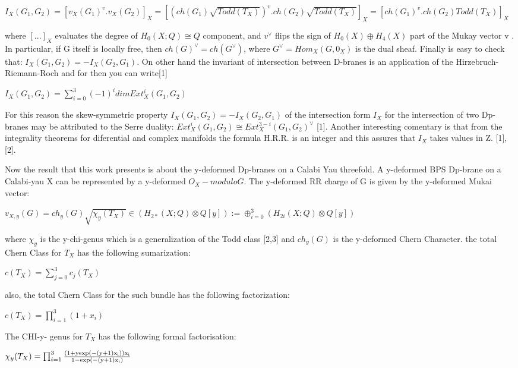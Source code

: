\documentclass[a4paper,a4paper]{article}
\begin{document}
\begin{center}
\setlength{\baselineskip}{30pt}
{  $ I_{X}(G_1,G_2)=[v_{X}(G_1)^v.v_{X}(G_2)]_X=[(ch(G_1)\sqrt{Todd(T_{X})})^v.ch(G_2)\sqrt{Todd(T_{X})}]_X=[ch(G_1)^v.ch(G_2)Todd(T_{X})]_X $ }
\end{center}
where $ [...]_X $  evaluates the degree of $ H_{0}(X;Q){\cong}Q$ component, and $v^{\vee}$ flips the sign of $H_{0}(X){\oplus}H_{4}(X)$ part of the Mukay vector v . In particular, if G itself is locally free, then $ch(G)^{\vee}=ch(G^{\vee})$, where  $ G^{\vee}=Hom_{X}(G,0_X)$ is the dual sheaf. Finally is easy to check that: $I_{X}(G_1,G_2) =-I_{X}(G_2,G_1)$.
On other hand the invariant of intersection between D-branes is an application of the Hirzebruch-Riemann-Roch and for then you can write[1]
\begin{center}

{  $ I_{X}(G_1,G_2)=\sum_{i=0}^{3}(-1)^idimExt^i_X(G_1,G_2) $ }
\end{center}
For this reason the skew-symmetric property $I_{X}(G_1,G_2) =-I_{X}(G_2,G_1)$ of the intersection form $I_X$  for the intersection of two Dp-branes may be attributed to the Serre duality: $Ext^i_X(G_1,G_2){\cong}Ext^{3-i}_X(G_1,G_2)^{\vee}$ [1]. Another interesting comentary is that from the integrality theorems for diferential and complex manifolds the formula H.R.R. is an integer and this assures that
$I_X$ takes values in Z. [1],[2].
 
Now the result that this work presents is about the y-deformed Dp-branes on a Calabi Yau threefold. A y-deformed BPS Dp-brane on a Calabi-yau X can be represented by a y-deformed  $O_{X}-modulo G$.  The y-deformed RR charge of G is given by the y-deformed Mukai vector:
\begin{center}
{  $ v_{X,y}(G)=ch_y(G)\sqrt{{\chi}_y(T_{X})}{\in}(H_{2*}(X;Q){\otimes}Q[y]):={\oplus}_{i=0}^3(H_{2i}(X;Q){\otimes}Q[y])  $ }
\end{center}
where ${\chi}_y$ is the y-chi-genus which is a generalization of the Todd class [2,3] and $ch_y(G)$ is the y-deformed Chern Character. the total Chern Class for $T_{X}$  has the following sumarization:
\begin{center}
{  $ c(T_{X}) = \sum_{j=0}^{3}c_j(T_{X}) $ }
\end{center} 
also, the total Chern Class for the such bundle has the following factorization:

\begin{center}
{  $ c(T_{X}) = \prod_{i=1}^{3}(1+x_i)$ }
\end{center}
The  CHI-y- genus for $T_{X}$ has the following formal factorisation:
\begin{center}
{  $ {\chi}_y(T_{X}) = \prod_{i=1}^3\frac{\rm(1+yexp(-(y+1)x_i))x_i }{\rm 1-exp(-(y+1)x_i)}$ }
\end{center}
\end{document}
